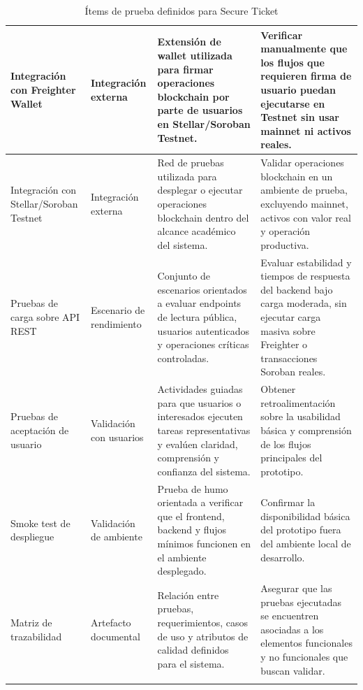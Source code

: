 \documentclass[12pt,letterpaper]{article}
\begin{document}
\begin{longtable}{|
>{\raggedright\arraybackslash}p{2.8cm}|
>{\raggedright\arraybackslash}p{2.5cm}|
>{\raggedright\arraybackslash}p{5.3cm}|
>{\raggedright\arraybackslash}p{4.2cm}|}
Integración con Freighter Wallet &
Integración externa &
Extensión de wallet utilizada para firmar operaciones blockchain por parte de usuarios en Stellar/Soroban Testnet. &
Verificar manualmente que los flujos que requieren firma de usuario puedan ejecutarse en Testnet sin usar mainnet ni activos reales. \\
\hline

Integración con Stellar/Soroban Testnet &
Integración externa &
Red de pruebas utilizada para desplegar o ejecutar operaciones blockchain dentro del alcance académico del sistema. &
Validar operaciones blockchain en un ambiente de prueba, excluyendo mainnet, activos con valor real y operación productiva. \\
\hline

Pruebas de carga sobre API REST &
Escenario de rendimiento &
Conjunto de escenarios orientados a evaluar endpoints de lectura pública, usuarios autenticados y operaciones críticas controladas. &
Evaluar estabilidad y tiempos de respuesta del backend bajo carga moderada, sin ejecutar carga masiva sobre Freighter o transacciones Soroban reales. \\
\hline

Pruebas de aceptación de usuario &
Validación con usuarios &
Actividades guiadas para que usuarios o interesados ejecuten tareas representativas y evalúen claridad, comprensión y confianza del sistema. &
Obtener retroalimentación sobre la usabilidad básica y comprensión de los flujos principales del prototipo. \\
\hline

Smoke test de despliegue &
Validación de ambiente &
Prueba de humo orientada a verificar que el frontend, backend y flujos mínimos funcionen en el ambiente desplegado. &
Confirmar la disponibilidad básica del prototipo fuera del ambiente local de desarrollo. \\
\hline

Matriz de trazabilidad &
Artefacto documental &
Relación entre pruebas, requerimientos, casos de uso y atributos de calidad definidos para el sistema. &
Asegurar que las pruebas ejecutadas se encuentren asociadas a los elementos funcionales y no funcionales que buscan validar. \\
\hline

\caption{Ítems de prueba definidos para Secure Ticket}
\label{tab:items-prueba-secure-ticket}\\
\end{longtable}

\endgroup
\end{document}
